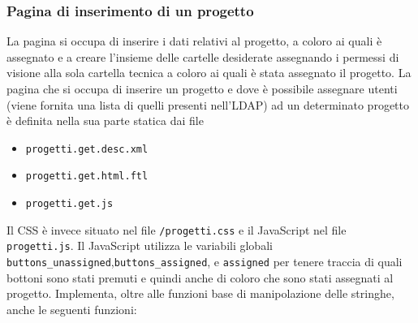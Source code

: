 \subsubsection{Pagina di inserimento di un progetto}
La pagina si occupa di inserire i dati relativi al progetto, a coloro ai quali è assegnato e a creare l'insieme delle cartelle desiderate assegnando i permessi di visione alla sola cartella tecnica a coloro ai quali è stata assegnato il progetto.
La pagina che si occupa di inserire un progetto e dove è possibile assegnare utenti (viene fornita una lista di quelli presenti nell’LDAP) ad un determinato progetto è definita nella sua parte statica dai file
\begin{itemize}
\item \texttt{progetti.get.desc.xml}
\item \texttt{progetti.get.html.ftl}
\item \texttt{progetti.get.js}
\end{itemize}
Il CSS è invece situato nel file \texttt{/progetti.css} e il JavaScript nel file \texttt{progetti.js}.
Il JavaScript utilizza le variabili globali  \texttt{buttons\_unassigned},\texttt{buttons\_assigned}, e  \texttt{assigned}
 per tenere traccia  di quali bottoni sono stati premuti e quindi anche di coloro che sono stati assegnati al progetto. Implementa,  oltre alle funzioni base di manipolazione delle stringhe, anche le seguenti funzioni:
